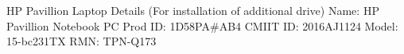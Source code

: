 HP Pavillion Laptop Details (For installation of additional drive)
Name: HP Pavillion Notebook PC
Prod ID: 1D58PA#AB4
CMIIT ID: 2016AJ1124
Model: 15-bc231TX
RMN: TPN-Q173